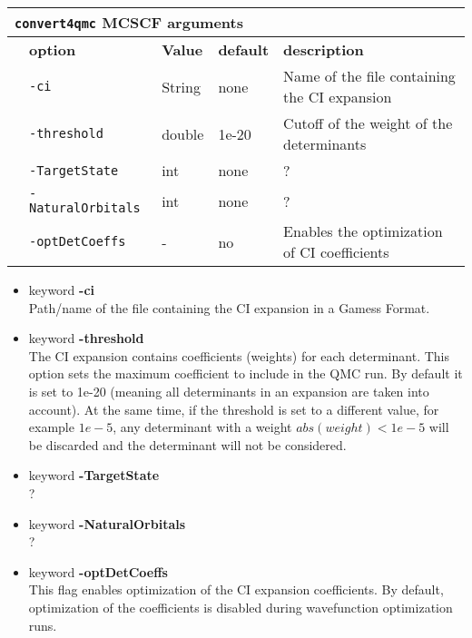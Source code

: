  \begin{table}[h]
 \begin{center}
 \begin{tabularx}{\textwidth}{l l l l l }
 \hline
 \multicolumn{5}{l}{\texttt{convert4qmc} MCSCF arguments} \\
 \hline
    &   \bfseries option      & \bfseries Value & \bfseries default   & \bfseries description \\
    &   \texttt{-ci    } & String     &   none & Name of the file containing the CI expansion  \\
    &   \texttt{-threshold         } &  double    &  1e-20 & Cutoff of the weight of the determinants  \\
    &   \texttt{-TargetState      } & int  &  none & ?  \\
    &   \texttt{-NaturalOrbitals      } &  int      &  none   & ?  \\
    &   \texttt{-optDetCoeffs      } &  -      &   no & Enables the optimization of CI coefficients \\
    \hline
     \end{tabularx}
 \end{center}
 \end{table}
\begin{itemize}
\item keyword \textbf{-ci}\\
Path/name of the file containing the CI expansion in a Gamess Format.
\item keyword \textbf{-threshold}\\
The CI expansion contains coefficients (weights) for each determinant. This option sets the maximum coefficient to include in the QMC run. By default it is set to 1e-20 (meaning all determinants in an expansion are taken into account). At the same time, if the threshold is set to a different value, for example $1e-5$, any determinant with a weight $abs(weight) < 1e-5$ will be discarded and the determinant will not be considered. 
\item keyword \textbf{-TargetState}\\
?
\item keyword \textbf{-NaturalOrbitals}\\
?
\item keyword \textbf{-optDetCoeffs}\\
This flag enables optimization of the CI expansion coefficients. By default, optimization of the coefficients is disabled during wavefunction optimization runs. 
\end{itemize}

